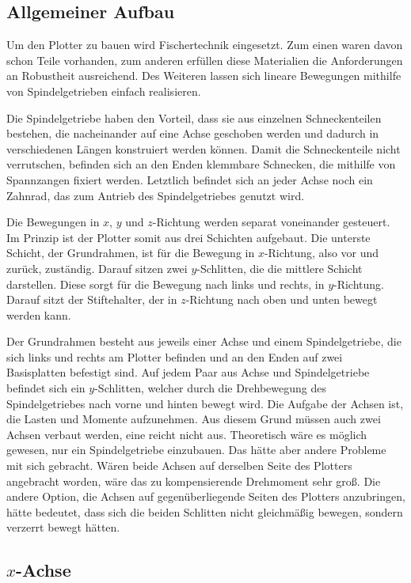 \documentclass[conference,compsoc,final,a4paper]{IEEEtran}
\begin{document}
\subsection{Allgemeiner Aufbau}

Um den Plotter zu bauen wird Fischertechnik eingesetzt. Zum einen waren davon schon Teile vorhanden, zum anderen erfüllen diese
Materialien die Anforderungen an Robustheit ausreichend. Des Weiteren lassen sich lineare Bewegungen mithilfe von Spindelgetrieben
 einfach realisieren.

Die Spindelgetriebe haben den Vorteil, dass sie aus einzelnen Schneckenteilen bestehen, die nacheinander auf eine Achse geschoben
werden und dadurch in verschiedenen Längen konstruiert werden können. Damit die Schneckenteile nicht verrutschen, befinden sich an
den Enden klemmbare Schnecken, die mithilfe von Spannzangen fixiert werden. Letztlich befindet sich an jeder Achse noch ein Zahnrad,
das zum Antrieb des Spindelgetriebes genutzt wird.

Die Bewegungen in $x$, $y$ und $z$-Richtung werden separat voneinander gesteuert. Im Prinzip ist der Plotter somit aus drei Schichten
aufgebaut. Die unterste Schicht, der Grundrahmen, ist für die Bewegung in $x$-Richtung, also vor und zurück, zuständig. Darauf
sitzen zwei $y$-Schlitten, die die mittlere Schicht darstellen. Diese sorgt für die Bewegung nach links und rechts, in $y$-Richtung.
Darauf sitzt der Stiftehalter, der in $z$-Richtung nach oben und unten bewegt werden kann.

Der Grundrahmen besteht aus jeweils einer Achse und einem Spindelgetriebe, die sich links und rechts am Plotter befinden und an
den Enden auf zwei Basisplatten befestigt sind. Auf jedem Paar aus Achse und Spindelgetriebe befindet sich ein $y$-Schlitten, welcher
durch die Drehbewegung des Spindelgetriebes nach vorne und hinten bewegt wird. Die Aufgabe der Achsen ist, die Lasten und Momente
aufzunehmen. Aus diesem Grund müssen auch zwei Achsen verbaut werden, eine reicht nicht aus.
Theoretisch wäre es möglich gewesen, nur ein Spindelgetriebe einzubauen. Das hätte aber andere Probleme mit sich gebracht. Wären beide Achsen auf derselben Seite des Plotters angebracht worden, wäre das zu kompensierende Drehmoment sehr groß. Die andere Option, die Achsen auf gegenüberliegende Seiten des Plotters anzubringen, hätte bedeutet, dass sich die beiden Schlitten nicht gleichmäßig bewegen, sondern verzerrt bewegt hätten.

\subsection{$x$-Achse}
\end{document}
